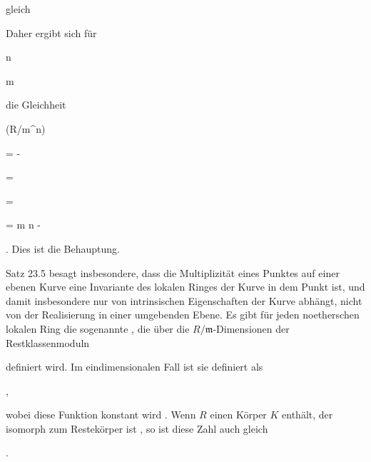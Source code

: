 { gleich

 Daher ergibt sich für


\mavergleichskette

{\vergleichskette

{n
}

{ \geq }{m
}

{  }{
}

{    }{
}

{   }{
}

}
{}{}{}
die Gleichheit


\mavergleichskettealign

{\vergleichskettealign

{ \dim(R/{\mathfrak m}^n)
}

{ =} { - 
}

{ =} {
}

{ =} {
}

{ =} { m n - 
}

}
{}
{}{.}
Dies ist die Behauptung.


}



{}

{


Satz 23.5
besagt insbesondere, dass die Multiplizität eines Punktes auf einer ebenen Kurve eine Invariante des lokalen Ringes der Kurve in dem Punkt ist, und damit insbesondere nur von intrinsischen Eigenschaften der Kurve abhängt, nicht von der Realisierung in einer umgebenden Ebene. Es gibt für jeden noetherschen lokalen Ring die sogenannte  {,} die über die $R/{\mathfrak m}$-Dimensionen der Restklassenmoduln

 definiert wird. Im eindimensionalen Fall ist sie definiert als


 { , }


wobei diese Funktion konstant wird
 {} {.}
Wenn $R$ einen Körper $K$ enthält, der isomorph zum Restekörper ist
 {} {,}
so ist diese Zahl auch gleich


 { . }


}


